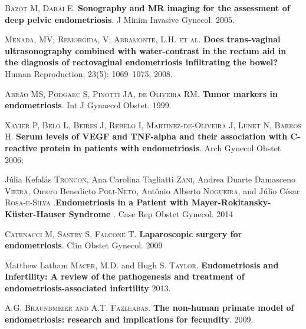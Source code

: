 \documentclass[12pt]{article} %
\begin{document}
\vspace{0,5cm}

\textsc{Bazot M, Daraï E}.\textbf{ Sonography and MR imaging for the
assessment of deep pelvic endometriosis}. J Minim Invasive
Gynecol. 2005.

\vspace{0,5cm}

\textsc{Menada, MV; Remorgida, V; Abbamonte, L.H. et al}.\textbf{ Does trans-vaginal ultrasonography combined with water-contrast in the rectum aid in the diagnosis of rectovaginal endometriosis infiltrating the bowel?} Human Reproduction, 23(5): 1069–1075, 2008.

\vspace{0,5cm}

\textsc{Abrão MS, Podgaec S, Pinotti JA, de Oliveira RM}. \textbf{Tumor markers
in endometriosis}. Int J Gynaecol Obstet. 1999.

\vspace{0,5cm}

\textsc{Xavier P, Belo L, Beires J, Rebelo I, Martinez-de-Oliveira J, Lunet N, Barros H}.
\textbf{Serum levels of VEGF and TNF-alpha and their association with C-reactive protein in patients with endometriosis}. Arch Gynecol Obstet 2006;

\vspace{0,5cm}

Júlia Kefalás\textsc{ Troncon}, Ana Carolina Tagliatti\textsc{ Zani}, Andrea Duarte Damasceno\textsc{ Vieira}, Omero Benedicto\textsc{ Poli-Neto}, Antônio Alberto \textsc{Nogueira}, and Júlio César\textsc{ Rosa-e-Silva} .\textbf{Endometriosis in a Patient with Mayer-Rokitansky-Küster-Hauser Syndrome} . Case Rep Obstet Gynecol. 2014

\vspace{0,5cm}

\textsc{Catenacci M, Sastry S, Falcone T}.\textbf{ Laparoscopic surgery for endometriosis}. Clin Obstet Gynecol. 2009

\vspace{0,5cm}

Matthew Latham\textsc{ Macer}, M.D. and Hugh S.\textsc{ Taylor}. \textbf{Endometriosis and Infertility: A review of the pathogenesis and treatment of endometriosis-associated infertility} 2013.

\vspace{0,5cm}

\textsc{A.G. Braundmeier and A.T. Fazleabas}. \textbf{The non-human primate model of endometriosis: research and implications for fecundity}. 2009.
\end{document}

